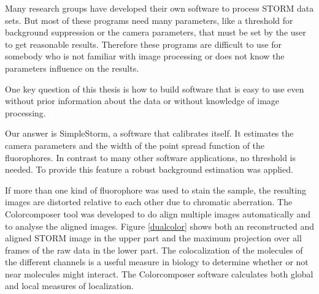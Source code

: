 Many research groups have developed their own software to process STORM data sets. But most of these programs need many parameters, like a threshold for background suppression or the camera parameters, that must be set by the user to get reasonable results. Therefore these programs are difficult to use for somebody who is not familiar with image processing or does not know the parameters influence on the results.\newline

One key question of this thesis is how to build software that is easy to use even without prior information about the data or without knowledge of image processing. \newline

Our answer is SimpleStorm, a software that calibrates itself. It estimates the camera parameters and the width of the point spread function of the fluorophores. In contrast to many other software applications, no threshold is needed. To provide this feature a robust background estimation was applied.\newline

If more than one kind of fluorophore was used to stain the sample, the resulting images are distorted relative to each other due to chromatic aberration. The Colorcomposer tool was developed to do align multiple images automatically and to analyse the aligned images. Figure \ref{dualcolor} shows both an reconstructed and aligned STORM image in the upper part and the maximum projection over all frames of the raw data in the lower part. The colocalization of the molecules of the different channels is a useful measure in biology to determine whether or not near molecules might interact. The Colorcomposer software calculates both global and local measures of localization.

